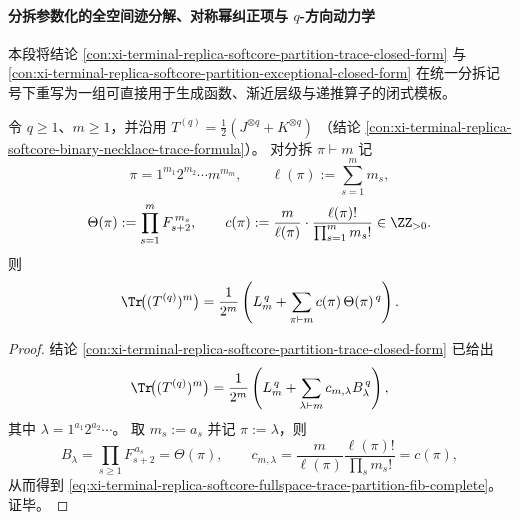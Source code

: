 \paragraph{分拆参数化的全空间迹分解、对称幂纠正项与 \texorpdfstring{$q$}{q}-方向动力学}
本段将结论 \ref{con:xi-terminal-replica-softcore-partition-trace-closed-form} 与
\ref{con:xi-terminal-replica-softcore-partition-exceptional-closed-form}
在统一分拆记号下重写为一组可直接用于生成函数、渐近层级与递推算子的闭式模板。

\begin{theorem}\label{thm:xi-terminal-replica-softcore-fullspace-trace-partition-fib-complete}
令 \(q\ge 1\)、\(m\ge 1\)，并沿用
\(
T^{(q)}=\frac12(J^{\otimes q}+K^{\otimes q})
\)
（结论 \ref{con:xi-terminal-replica-softcore-binary-necklace-trace-formula}）。
对分拆 \(\pi\vdash m\) 记
\[
\pi=1^{m_1}2^{m_2}\cdots m^{m_m},\qquad
\ell(\pi):=\sum_{s=1}^{m}m_s,
\]
\[
\Theta(\pi):=\prod_{s=1}^{m}F_{s+2}^{\,m_s},
\qquad
c(\pi):=\frac{m}{\ell(\pi)}\cdot\frac{\ell(\pi)!}{\prod_{s=1}^{m}m_s!}\in\ZZ_{>0}.
\]
则
\begin{equation}\label{eq:xi-terminal-replica-softcore-fullspace-trace-partition-fib-complete}
\Tr\!\bigl((T^{(q)})^m\bigr)
=\frac1{2^m}\left(
L_m^{\,q}+\sum_{\pi\vdash m}c(\pi)\,\Theta(\pi)^{\,q}
\right).
\end{equation}
\end{theorem}
\begin{proof}
结论 \ref{con:xi-terminal-replica-softcore-partition-trace-closed-form} 已给出
\[
\Tr\!\bigl((T^{(q)})^m\bigr)
=\frac1{2^m}\left(L_m^{\,q}+\sum_{\lambda\vdash m}c_{m,\lambda}B_\lambda^{\,q}\right),
\]
其中 \(\lambda=1^{a_1}2^{a_2}\cdots\)。
取 \(m_s:=a_s\) 并记 \(\pi:=\lambda\)，则
\[
B_\lambda=\prod_{s\ge 1}F_{s+2}^{\,a_s}=\Theta(\pi),\qquad
c_{m,\lambda}=\frac{m}{\ell(\pi)}\frac{\ell(\pi)!}{\prod_s m_s!}=c(\pi),
\]
从而得到 \eqref{eq:xi-terminal-replica-softcore-fullspace-trace-partition-fib-complete}。证毕。
\end{proof}

